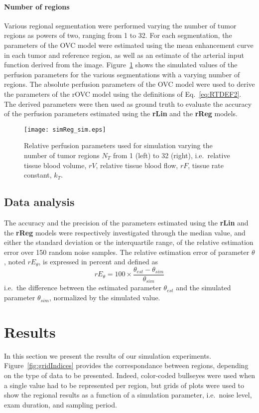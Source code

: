 \paragraph{Number of regions}
Various regional segmentation were performed varying the number of tumor regions as powers of two, ranging from 1 to 32.
For each segmentation, the parameters of the OVC model were estimated using the mean enhancement curve in each tumor and reference region, as well as an estimate of the arterial input function derived from the image. 
Figure~\ref{fig:simReg} shows the simulated values of the perfusion parameters for the various segmentations with a varying number of regions. 
The absolute perfusion parameters of the OVC model were used to derive the parameters of the rOVC model using the definitions of Eq.~\ref{eq:RTDEF2}.
The derived parameters were then used as ground truth to evaluate the accuracy of the perfusion parameters estimated using the \textbf{rLin} and the \textbf{rReg} models.

\begin{figure}
\texttt{[image: simReg\_sim.eps]}
\caption{Relative perfusion parameters used for simulation varying the number of tumor regions $N_T$ from 1 (left) to 32 (right), i.e.~relative tissue blood volume, $rV$, relative tissue blood flow, $rF$, tissue rate constant, $k_T$.}
\label{fig:simReg}
\end{figure}

\subsection{Data analysis}\label{sec:dataAnalysis}
The accuracy and the precision of the parameters estimated using the \textbf{rLin} and the \textbf{rReg} models were respectively investigated through the median value, and either the standard deviation or the interquartile range, of the relative estimation error over 150 random noise samples.
The relative estimation error of parameter $\theta$, noted $rE_{\theta}$, is expressed in percent and defined as
\begin{equation}
rE_{\theta} = 100 \times \frac{\theta_{est}-\theta_{sim}}{\theta_{sim}}
\end{equation}
i.e.~the difference between the estimated parameter $\theta_{est}$ and the simulated parameter $\theta_{sim}$, normalized by the simulated value.

\section{Results}
In this section we present the results of our simulation experiments.
Figure~\ref{fig:gridIndices} provides the correspondance between regions, depending on the type of data to be presented.
Indeed, color-coded bullseyes were used when a single value had to be represented per region, but grids of plots were used to show the regional results as a function of a simulation parameter, i.e.~noise level, exam duration, and sampling period.

